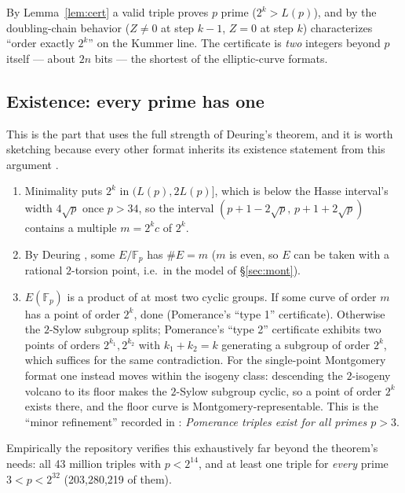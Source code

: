 \documentclass[11pt]{amsart}
\newcommand{\F}{\mathbb{F}}
\theoremstyle{plain}
\theoremstyle{definition}
\theoremstyle{remark}
\begin{document}
By Lemma~\ref{lem:cert} a valid triple proves $p$ prime ($2^k > L(p)$), and by
\cite[Lemmas 2.1--2.2]{Pom87} the doubling-chain behavior ($Z \ne 0$ at step $k-1$, $Z = 0$ at step $k$)
characterizes ``order exactly $2^k$'' on the Kummer line.  The certificate is \emph{two} integers beyond
$p$ itself --- about $2n$ bits --- the shortest of the elliptic-curve formats.

\subsection{Existence: every prime has one}\label{sec:pomexist}

This is the part that uses the full strength of Deuring's theorem, and it is worth sketching because
every other format inherits its existence statement from this argument \cite[Thm.~3.3]{Pom87}.

\begin{enumerate}
\item Minimality puts $2^k$ in $(L(p), 2L(p)]$, which is below the Hasse interval's width $4\sqrt p$
once $p > 34$, so the interval $(p+1-2\sqrt p,\, p+1+2\sqrt p)$ contains a multiple $m = 2^k c$ of
$2^k$.
\item By Deuring \cite{Deu41}, some $E/\F_p$ has $\#E = m$ ($m$ is even, so $E$ can be taken with a
rational $2$-torsion point, i.e.\ in the model of \S\ref{sec:mont}).
\item $E(\F_p)$ is a product of at most two cyclic groups.  If some curve of order $m$ has a point of
order $2^k$, done (Pomerance's ``type 1'' certificate).  Otherwise the $2$-Sylow subgroup splits;
Pomerance's ``type 2'' certificate exhibits two points of orders $2^{k_1}, 2^{k_2}$ with
$k_1+k_2 = k$ generating a subgroup of order $2^k$, which suffices for the same contradiction.  For the
single-point Montgomery format one instead moves within the isogeny class: descending the $2$-isogeny
volcano to its floor \cite{Kohel96,Suth13} makes the $2$-Sylow subgroup cyclic, so a point of order
$2^k$ exists there, and the floor curve is Montgomery-representable.  This is the ``minor refinement''
recorded in \cite{DANGER3}: \emph{Pomerance triples exist for all primes $p > 3$}.
\end{enumerate}

Empirically the repository verifies this exhaustively far beyond the theorem's needs: all 43 million
triples with $p < 2^{14}$, and at least one triple for \emph{every} prime $3 < p < 2^{32}$
(203{,}280{,}219 of them).
\end{document}
